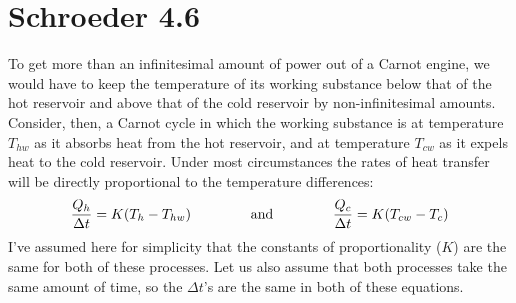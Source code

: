 \documentclass[10pt]{article}
\begin{document}
	\section*{Schroeder 4.6}
	To get more than an infinitesimal amount of power out of a Carnot engine, we would have to keep 
	the temperature of its working substance below that of the hot reservoir and above that of the cold 
	reservoir by non-infinitesimal amounts. Consider, then, a Carnot cycle in which the working substance 
	is at temperature $T_{hw}$ as it absorbs heat from the hot reservoir, and at temperature $T_{cw}$ as 
	it expels heat to the cold reservoir. Under most circumstances the rates of heat transfer 
	will be directly proportional to the temperature differences:
	\[
		\frac{Q_h}{\Delta t} = K(T_h - T_{hw}) \hspace{1.5cm} \text{and}\hspace{1.5cm} \frac{Q_c}{\Delta t} = K(T_{cw} - T_c)
	\]   
	I've assumed here for simplicity that the constants of proportionality ($K$) are the same for both 
	of these processes. Let us also assume that both processes take the same amount of time, so the 
	$\Delta t$'s are the same in both of these equations.
\end{document}
